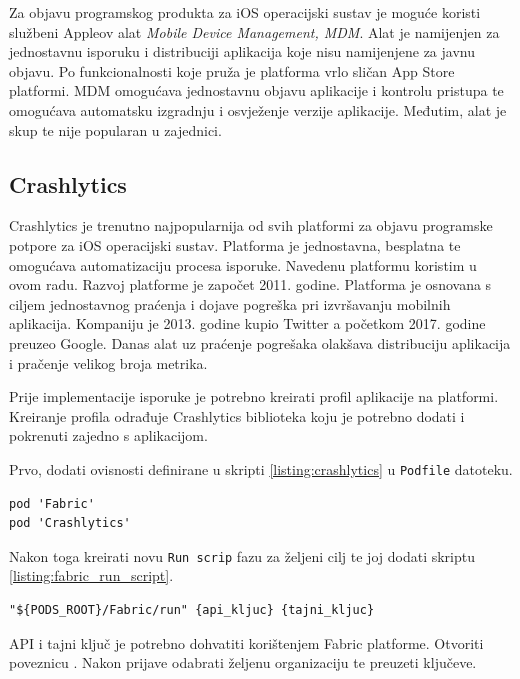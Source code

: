 \documentclass[times, utf8, diplomski, numeric]{fer}
\begin{document}
Za objavu programskog produkta za iOS operacijski sustav je moguće koristi službeni Appleov alat \textit{Mobile Device Management, MDM}. Alat je namijenjen za jednostavnu isporuku i distribuciji aplikacija koje nisu namijenjene za javnu objavu. Po funkcionalnosti koje pruža je platforma vrlo sličan App Store platformi. MDM omogućava jednostavnu objavu aplikacije i kontrolu pristupa te omogućava automatsku izgradnju i osvježenje verzije aplikacije. Međutim, alat je skup te nije popularan u zajednici.

\subsection{Crashlytics}

Crashlytics je trenutno najpopularnija od svih platformi za objavu programske potpore za iOS operacijski sustav. Platforma je jednostavna, besplatna te omogućava automatizaciju procesa isporuke. Navedenu platformu koristim u ovom radu. Razvoj platforme je započet 2011. godine. Platforma je osnovana s ciljem jednostavnog praćenja i dojave pogreška pri izvršavanju mobilnih aplikacija. Kompaniju je 2013. godine kupio Twitter a početkom 2017. godine preuzeo Google. Danas alat uz praćenje pogrešaka olakšava distribuciju aplikacija i pračenje velikog broja metrika.

Prije implementacije isporuke je potrebno kreirati profil aplikacije na platformi. Kreiranje profila odrađuje Crashlytics biblioteka koju je potrebno dodati i pokrenuti zajedno s aplikacijom.

Prvo, dodati ovisnosti definirane u skripti \ref{listing:crashlytics} u \verb|Podfile| datoteku.

\begin{lstlisting}[caption=Ovisnosti potrebne za objavu korištenjem Crashlytisc platforme, label=listing:crashlytics]
pod 'Fabric'
pod 'Crashlytics'
\end{lstlisting}

Nakon toga kreirati novu \verb|Run scrip| fazu za željeni cilj te joj dodati skriptu \ref{listing:fabric_run_script}.

\begin{lstlisting}[caption=Fabric Run Script faza, label=listing:fabric_run_script]
"${PODS_ROOT}/Fabric/run" {api_kljuc} {tajni_kljuc}
\end{lstlisting}

API i tajni ključ je potrebno dohvatiti korištenjem Fabric platforme. Otvoriti poveznicu . Nakon prijave odabrati željenu organizaciju te preuzeti ključeve.
\end{document}
